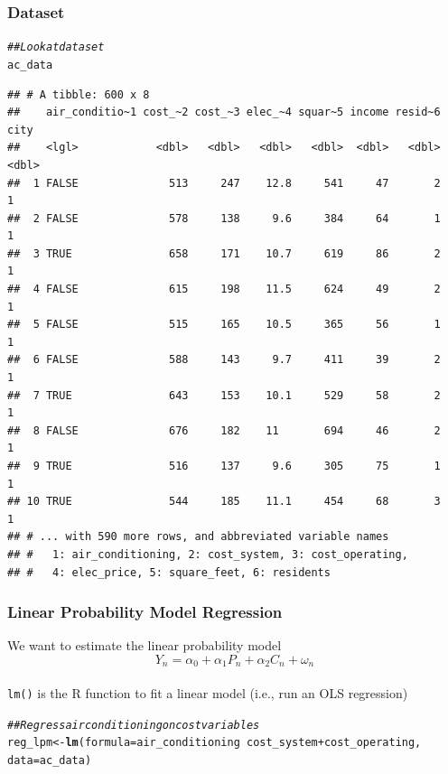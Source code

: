 \documentclass{beamer}\usepackage[]{graphicx}\usepackage[]{xcolor}
\makeatletter
\newcommand{\hlcom}[1]{\textcolor[rgb]{0.678,0.584,0.686}{\textit{#1}}}%
\newcommand{\hlopt}[1]{\textcolor[rgb]{0,0,0}{#1}}%
\newcommand{\hlstd}[1]{\textcolor[rgb]{0.345,0.345,0.345}{#1}}%
\newcommand{\hlkwb}[1]{\textcolor[rgb]{0.69,0.353,0.396}{#1}}%
\newcommand{\hlkwc}[1]{\textcolor[rgb]{0.333,0.667,0.333}{#1}}%
\newcommand{\hlkwd}[1]{\textcolor[rgb]{0.737,0.353,0.396}{\textbf{#1}}}%
\newenvironment{kframe}{%
 \def\at@end@of@kframe{}%
 \ifinner\ifhmode%
  \def\at@end@of@kframe{\end{minipage}}%
  \begin{minipage}{\columnwidth}%
 \fi\fi%
 \def\FrameCommand##1{\hskip\@totalleftmargin \hskip-\fboxsep
 \colorbox{shadecolor}{##1}\hskip-\fboxsep
     \hskip-\linewidth \hskip-\@totalleftmargin \hskip\columnwidth}%
 \MakeFramed {\advance\hsize-\width
   \@totalleftmargin\z@ \linewidth\hsize
   \@setminipage}}%
 {\par\unskip\endMakeFramed%
 \at@end@of@kframe}
\newenvironment{knitrout}{}{} %
\makeatother
\begin{document}
\begin{frame}[fragile]\frametitle{Dataset}
\begin{knitrout}\footnotesize
{}\color{fgcolor}\begin{kframe}
\begin{alltt}
\hlcom{## Look at dataset}
\hlstd{ac_data}
\end{alltt}
\begin{verbatim}
## # A tibble: 600 x 8
##    air_conditio~1 cost_~2 cost_~3 elec_~4 squar~5 income resid~6  city
##    <lgl>            <dbl>   <dbl>   <dbl>   <dbl>  <dbl>   <dbl> <dbl>
##  1 FALSE              513     247    12.8     541     47       2     1
##  2 FALSE              578     138     9.6     384     64       1     1
##  3 TRUE               658     171    10.7     619     86       2     1
##  4 FALSE              615     198    11.5     624     49       2     1
##  5 FALSE              515     165    10.5     365     56       1     1
##  6 FALSE              588     143     9.7     411     39       2     1
##  7 TRUE               643     153    10.1     529     58       2     1
##  8 FALSE              676     182    11       694     46       2     1
##  9 TRUE               516     137     9.6     305     75       1     1
## 10 TRUE               544     185    11.1     454     68       3     1
## # ... with 590 more rows, and abbreviated variable names
## #   1: air_conditioning, 2: cost_system, 3: cost_operating,
## #   4: elec_price, 5: square_feet, 6: residents
\end{verbatim}
\end{kframe}
\end{knitrout}
\end{frame}

\begin{frame}[fragile]\frametitle{Linear Probability Model Regression}
    We want to estimate the linear probability model
    $$Y_n = \alpha_0 + \alpha_1 P_n + \alpha_2 C_n + \omega_n$$ \\
	  \vspace{3ex}
    \texttt{lm()} is the R function to fit a linear model (i.e., run an OLS regression)
\begin{knitrout}\footnotesize
{}\color{fgcolor}\begin{kframe}
\begin{alltt}
\hlcom{## Regress air conditioning on cost variables}
\hlstd{reg_lpm} \hlkwb{<-} \hlkwd{lm}\hlstd{(}\hlkwc{formula} \hlstd{= air_conditioning} \hlopt{~} \hlstd{cost_system} \hlopt{+} \hlstd{cost_operating,}
              \hlkwc{data} \hlstd{= ac_data)}
\end{alltt}
\end{kframe}
\end{knitrout}
\end{frame}
\end{document}
